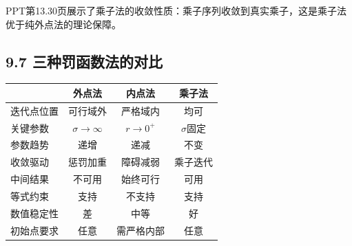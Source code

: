 PPT第13.30页展示了乘子法的收敛性质：乘子序列收敛到真实乘子，这是乘子法优于纯外点法的理论保障。

\medskip
{}
\medskip

\subsection{9.7 三种罚函数法的对比}

\begingroup\footnotesize\setlength{\tabcolsep}{3pt}
\begin{tabular}{@{}lccc@{}}
\toprule
& \textbf{外点法} & \textbf{内点法} & \textbf{乘子法} \\
\midrule
迭代点位置 & 可行域外 & 严格域内 & 均可 \\
关键参数 & $\sigma \to \infty$ & $r \to 0^+$ & $\sigma$固定 \\
参数趋势 & 递增 & 递减 & 不变 \\
收敛驱动 & 惩罚加重 & 障碍减弱 & 乘子迭代 \\
中间结果 & 不可用 & 始终可行 & 可用 \\
等式约束 & 支持 & 不支持 & 支持 \\
数值稳定性 & 差 & 中等 & 好 \\
初始点要求 & 任意 & 需严格内部 & 任意 \\
\bottomrule
\end{tabular}
\endgroup

\medskip


